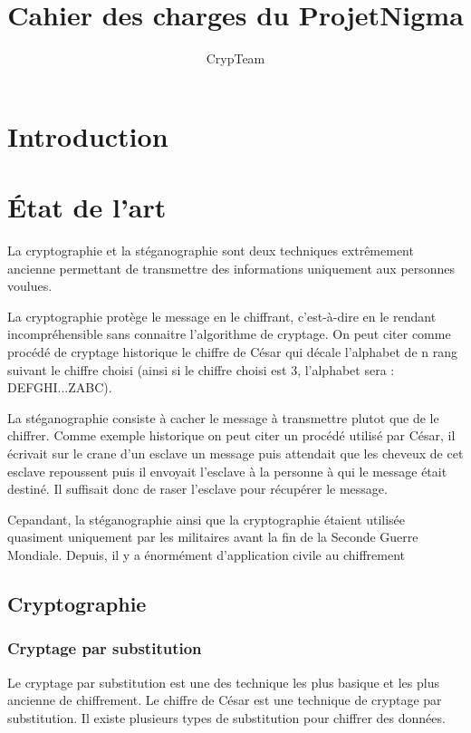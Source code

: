 \documentclass[a4paper,12pt]{article}
\title{Cahier des charges du ProjetNigma}
\author{CrypTeam}
\date{}
\begin{document}
	\maketitle{}
  	\tableofcontents
	\newpage				
	\section{Introduction}
	\newpage
	\section{\'{E}tat de l'art}
		La cryptographie et la stéganographie sont deux techniques extrêmement ancienne permettant de transmettre des informations uniquement aux personnes voulues.

 La cryptographie protège le message en le chiffrant, c'est-à-dire en le rendant incompréhensible sans connaitre l'algorithme de cryptage. On peut citer comme procédé de cryptage historique le chiffre de César qui décale l'alphabet de n rang suivant le chiffre choisi (ainsi si le chiffre choisi est 3, l'alphabet sera : DEFGHI...ZABC).

	La stéganographie consiste à cacher le message à transmettre plutot que de le chiffrer. Comme exemple historique on peut citer un procédé utilisé par César, il écrivait sur le crane d'un esclave un message puis attendait que les cheveux de cet esclave repoussent puis il envoyait l'esclave à la personne à qui le message était destiné. Il suffisait donc de raser l'esclave pour récupérer le message.

	Cepandant, la stéganographie ainsi que la cryptographie étaient utilisée quasiment uniquement par les militaires avant la fin de la Seconde Guerre Mondiale. Depuis, il y a énormément d'application civile au chiffrement 
		\subsection{Cryptographie}
			\subsubsection{Cryptage par substitution}
	Le cryptage par substitution  est une des technique les plus basique et les plus ancienne de chiffrement. Le chiffre de César est une technique de cryptage par substitution. Il existe plusieurs types de substitution pour chiffrer des données.
\end{document}
